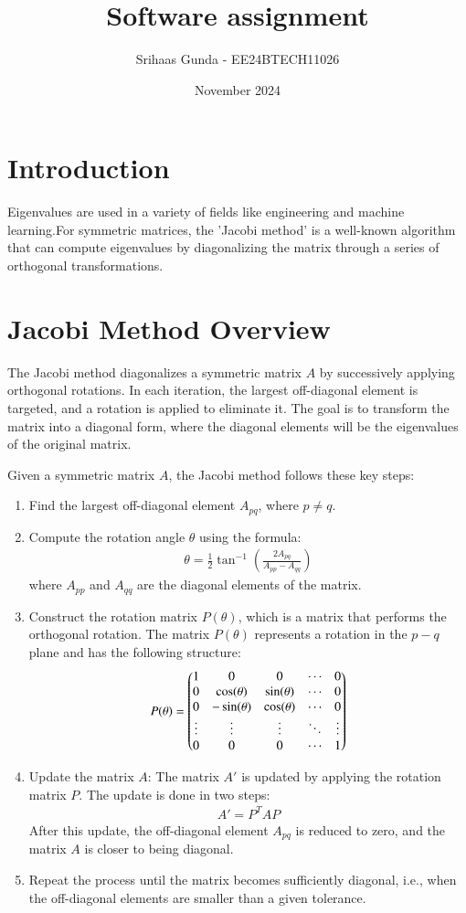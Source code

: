 \documentclass[journal]{IEEEtran}
\title{Software assignment}
\author{Srihaas Gunda - EE24BTECH11026}
\date{November 2024}
\begin{document}
\maketitle
\section*{\textbf{Introduction}}

Eigenvalues are used in a variety of fields like engineering and machine learning.For symmetric matrices, the 'Jacobi method' is a well-known algorithm that can compute eigenvalues by diagonalizing the matrix through a series of orthogonal transformations.

\section{Jacobi Method Overview}

The Jacobi method diagonalizes a symmetric matrix $A$ by successively applying orthogonal rotations. In each iteration, the largest off-diagonal element is targeted, and a rotation is applied to eliminate it. The goal is to transform the matrix into a diagonal form, where the diagonal elements will be the eigenvalues of the original matrix.

Given a symmetric matrix $A$, the Jacobi method follows these key steps:
\begin{enumerate}
    \item Find the largest off-diagonal element $ A_{pq}$, where $p \neq q$.
    \item Compute the rotation angle $\theta$ using the formula:
    \begin{align}
    \theta = \frac{1}{2} \tan^{-1}\left(\frac{2A_{pq}}{A_{pp} - A_{qq}}\right)
    \end{align}
    where $A_{pp} $ and $A_{qq} $ are the diagonal elements of the matrix.
    \item Construct the rotation matrix $P(\theta)$, which is a matrix that performs the orthogonal rotation. The matrix $P(\theta)$ represents a rotation in the $p - q $ plane and has the following structure:
\begin{align}
P(\theta) = 
\begin{pmatrix}
1 & 0 & 0 & \cdots & 0 \\
0 & \cos(\theta) & \sin(\theta) & \cdots & 0 \\
0 & -\sin(\theta) & \cos(\theta) & \cdots & 0 \\
\vdots & \vdots & \vdots & \ddots & \vdots \\
0 & 0 & 0 & \cdots & 1
\end{pmatrix}
\end{align}
    \item Update the matrix $A$: The matrix  $A'$ is updated by applying the rotation matrix $P$. The update is done in two steps:
    \begin{align}
    A' = P^T A P
    \end{align}
    After this update, the off-diagonal element $A_{pq}$ is reduced to zero, and the matrix $A$ is closer to being diagonal.
    \item Repeat the process until the matrix becomes sufficiently diagonal, i.e., when the off-diagonal elements are smaller than a given tolerance.
\end{enumerate}
\end{document}
